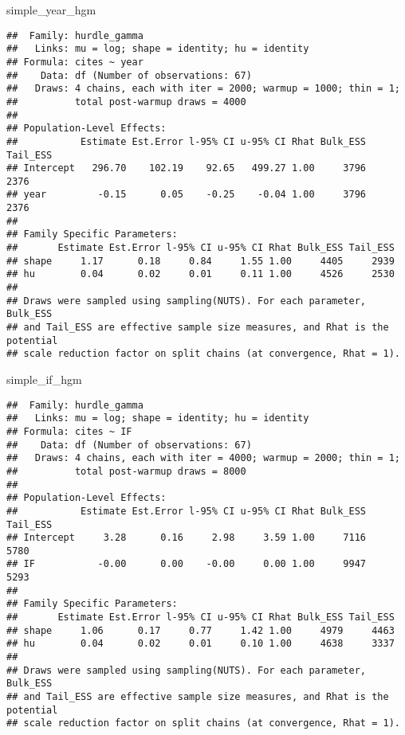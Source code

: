 \documentclass[
]{article}
\newenvironment{Shaded}{\begin{snugshade}}{\end{snugshade}}
\newcommand{\NormalTok}[1]{#1}
\begin{document}
\begin{Shaded}
\begin{Highlighting}[]
\NormalTok{simple\_year\_hgm}
\end{Highlighting}
\end{Shaded}

\begin{verbatim}
##  Family: hurdle_gamma 
##   Links: mu = log; shape = identity; hu = identity 
## Formula: cites ~ year 
##    Data: df (Number of observations: 67) 
##   Draws: 4 chains, each with iter = 2000; warmup = 1000; thin = 1;
##          total post-warmup draws = 4000
## 
## Population-Level Effects: 
##           Estimate Est.Error l-95% CI u-95% CI Rhat Bulk_ESS Tail_ESS
## Intercept   296.70    102.19    92.65   499.27 1.00     3796     2376
## year         -0.15      0.05    -0.25    -0.04 1.00     3796     2376
## 
## Family Specific Parameters: 
##       Estimate Est.Error l-95% CI u-95% CI Rhat Bulk_ESS Tail_ESS
## shape     1.17      0.18     0.84     1.55 1.00     4405     2939
## hu        0.04      0.02     0.01     0.11 1.00     4526     2530
## 
## Draws were sampled using sampling(NUTS). For each parameter, Bulk_ESS
## and Tail_ESS are effective sample size measures, and Rhat is the potential
## scale reduction factor on split chains (at convergence, Rhat = 1).
\end{verbatim}

\begin{Shaded}
\begin{Highlighting}[]
\NormalTok{simple\_if\_hgm}
\end{Highlighting}
\end{Shaded}

\begin{verbatim}
##  Family: hurdle_gamma 
##   Links: mu = log; shape = identity; hu = identity 
## Formula: cites ~ IF 
##    Data: df (Number of observations: 67) 
##   Draws: 4 chains, each with iter = 4000; warmup = 2000; thin = 1;
##          total post-warmup draws = 8000
## 
## Population-Level Effects: 
##           Estimate Est.Error l-95% CI u-95% CI Rhat Bulk_ESS Tail_ESS
## Intercept     3.28      0.16     2.98     3.59 1.00     7116     5780
## IF           -0.00      0.00    -0.00     0.00 1.00     9947     5293
## 
## Family Specific Parameters: 
##       Estimate Est.Error l-95% CI u-95% CI Rhat Bulk_ESS Tail_ESS
## shape     1.06      0.17     0.77     1.42 1.00     4979     4463
## hu        0.04      0.02     0.01     0.10 1.00     4638     3337
## 
## Draws were sampled using sampling(NUTS). For each parameter, Bulk_ESS
## and Tail_ESS are effective sample size measures, and Rhat is the potential
## scale reduction factor on split chains (at convergence, Rhat = 1).
\end{verbatim}
\end{document}

